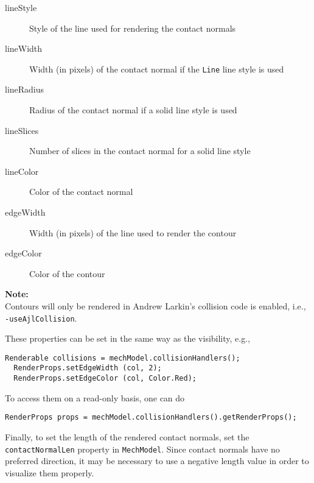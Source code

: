 \documentclass{article}
\begin{document}
\begin{description}

\item[lineStyle] \mbox{}
Style of the line used for rendering the contact normals

\item[lineWidth] \mbox{}
Width (in pixels) of the contact normal if the {\tt Line} line style is used

\item[lineRadius] \mbox{}
Radius of the contact normal if a solid line style is used

\item[lineSlices] \mbox{}
Number of slices in the contact normal for a solid line style

\item[lineColor] \mbox{}
Color of the contact normal

\item[edgeWidth] \mbox{}
Width (in pixels) of the line used to render the contour

\item[edgeColor] \mbox{}
Color of the contour

\end{description}

\begin{sideblock}
{\bf Note:}\\
Contours will only be rendered in Andrew Larkin's collision
code is enabled, i.e., {\tt -useAjlCollision}.
\end{sideblock}

These properties can be set in the same way as the visibility, e.g.,

\begin{lstlisting}[]
  Renderable collisions = mechModel.collisionHandlers();
  RenderProps.setEdgeWidth (col, 2);
  RenderProps.setEdgeColor (col, Color.Red);
\end{lstlisting}

To access them on a read-only basis, one can do
  
\begin{lstlisting}[]
  RenderProps props = mechModel.collisionHandlers().getRenderProps();
\end{lstlisting}

Finally, to set the length of the rendered contact normals, set the
{\tt contactNormalLen} property in {\tt MechModel}. Since contact normals have
no preferred direction, it may be necessary to use a negative length
value in order to visualize them properly.
\end{document}

